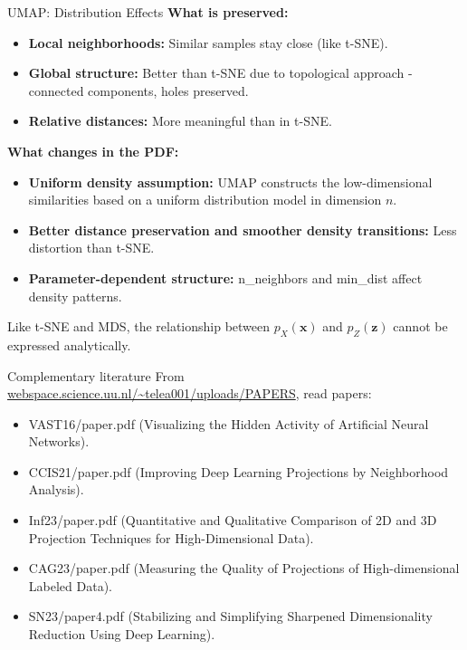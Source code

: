\documentclass{beamer}
\begin{document}
\begin{frame}{UMAP: Distribution Effects}
  \textbf{What is preserved:}
  \begin{itemize}
    \item \textbf{Local neighborhoods:} Similar samples stay close (like t-SNE).
    \item \textbf{Global structure:} Better than t-SNE due to topological approach - connected components, holes preserved.
    \item \textbf{Relative distances:} More meaningful than in t-SNE.
  \end{itemize}
  
  \textbf{What changes in the PDF:}
  \begin{itemize}
    \item \textbf{Uniform density assumption:} UMAP constructs the
      low-dimensional similarities based on a uniform distribution
      model in dimension $n$.
    \item \textbf{Better distance preservation and smoother density
      transitions:} Less distortion than t-SNE.
    \item \textbf{Parameter-dependent structure:} n\_neighbors and
      min\_dist affect density patterns.
  \end{itemize}
  
  \alert{Like t-SNE and MDS, the relationship between $p_X(\mathbf{x})$ and $p_Z(\mathbf{z})$ cannot be expressed analytically.}
\end{frame}

\begin{frame}{Complementary literature}
From \url{webspace.science.uu.nl/~telea001/uploads/PAPERS}, read papers:
    \vspace{0.3cm}
  \begin{itemize}
  \item VAST16/paper.pdf \small{(Visualizing the Hidden Activity of Artificial Neural Networks)}.
    \vspace{0.3cm}
  \item CCIS21/paper.pdf \small{(Improving Deep Learning Projections
    by Neighborhood Analysis)}.
    \vspace{0.3cm}
  \item Inf23/paper.pdf \small{(Quantitative and Qualitative Comparison of
    2D and 3D Projection Techniques for High-Dimensional
    Data)}. 
    \vspace{0.3cm}
  \item CAG23/paper.pdf \small{(Measuring the Quality of Projections of
    High-dimensional Labeled Data)}.
    \vspace{0.3cm}
  \item SN23/paper4.pdf \small{(Stabilizing and Simplifying Sharpened
    Dimensionality Reduction Using Deep Learning)}.
  \end{itemize}
  
\end{frame}
\end{document}
